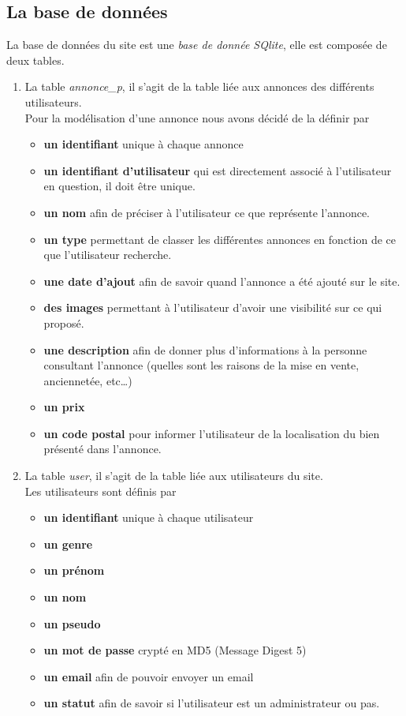 \documentclass[11pt,a4paper]{article}
\begin{document}
\subsection{La base de données}
La base de données du site est une \emph{base de donnée SQlite}, elle est composée de deux tables.
\begin{enumerate}
    \item La table \emph{annonce\_p}, il s'agit de la table liée aux annonces des différents utilisateurs.\\
    Pour la modélisation d'une annonce nous avons décidé de la définir par
    \begin{itemize}
        \item \textbf{un identifiant} unique à chaque annonce
        \item \textbf{un identifiant d'utilisateur} qui est directement associé à l'utilisateur en question, il doit être unique.
        \item \textbf{un nom} afin de préciser à l'utilisateur ce que représente l'annonce.
        \item \textbf{un type} permettant de classer les différentes annonces en fonction de ce que l'utilisateur recherche.
        \item \textbf{une date d'ajout} afin de savoir quand l'annonce a été ajouté sur le site.
        \item \textbf{des images} permettant à l'utilisateur d'avoir une visibilité sur ce qui proposé.
        \item \textbf{une description} afin de donner plus d'informations à la personne consultant l'annonce (quelles sont les raisons de la mise en vente, anciennetée, etc\dots)
        \item \textbf{un prix}
        \item \textbf{un code postal} pour informer l'utilisateur de la localisation du bien présenté dans l'annonce.
    \end{itemize}
    \item La table \emph{user}, il s'agit de la table liée aux utilisateurs du site.\\
    Les utilisateurs sont définis par 
    \begin{itemize}
        \item \textbf{un identifiant} unique à chaque utilisateur
        \item \textbf{un genre} 
        \item \textbf{un prénom}
        \item \textbf{un nom} 
        \item \textbf{un pseudo}
        \item \textbf{un mot de passe} crypté en MD5 (Message Digest 5)
        \item \textbf{un email} afin de pouvoir envoyer un email
        \item \textbf{un statut} afin de savoir si l'utilisateur est un administrateur ou pas.
    \end{itemize}
\end{enumerate}

\section{}
\end{document}
